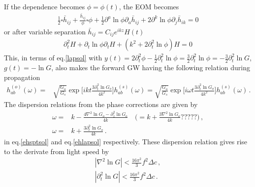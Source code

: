\documentclass[
 jor,
 amsmath,amssymb,preprint,
]{revtex4-2}
\begin{document}
If the dependence becomes $\phi = \phi(t)$, the EOM becomes
\begin{equation}
\begin{aligned}
\frac{1}{2}\square \bar{h}_{ij} + \frac{\bar{h}_{ij}}{\phi}\square \phi + \frac{1}{2} \partial^a \ln\phi \partial_a\bar{h}_{ij} + 2\partial^k \ln\phi\partial_j \bar{h}_{ik} = 0
\end{aligned}
\end{equation}
or after variable separation $\bar{h}_{ij} = C_{ij}e^{ikz}H(t)$
\begin{equation}
\begin{aligned}
\partial_t^2H + \partial_t\ln\phi \partial_tH + (k^2 + 2\partial_t^2\ln\phi) H = 0
\end{aligned}
\end{equation}
This, in terms of eq.\eqref{lapsol} with $y(t) = 2\partial_t^2\phi - \frac{1}{2}\partial_t^2\ln\phi = \frac{3}{2}\partial_t^2\ln\phi = -\frac{3}{2}\partial_t^2\ln G$, $g(t) = -\ln G$, also makes the forward GW having the following relation during propagation
\begin{equation}
\begin{aligned}
h^{(o)}_{ab}(\omega) = & \sqrt{\frac{G_o}{G_s}} \exp\bigg[ik t\frac{3\partial_t^2 \ln G_o}{4k^2} \bigg] h_{ab}^{(s)}(\omega) = \sqrt{\frac{G_o}{G_s}} \exp\bigg[i\omega t\frac{3\partial_t^2 \ln G_o}{4k^2} \bigg] h_{ab}^{(s)}(\omega)\,. \label{ehlapsol}
\end{aligned}
\end{equation}
The dispersion relations from the phase corrections are given by
\begin{align}
\omega = & k - \frac{ 4\nabla^2\ln G_o -\partial_z^2 \ln G_o}{4k} \quad \bigg( = k + \frac{ 3\nabla^2 \ln G_o}{4k}????? \bigg) \,, \\
\omega = & k + \frac{ 3\partial_t^2 \ln G_o}{4k} \,.
\end{align}
in eq.\eqref{ehsptsol} and eq.\eqref{ehlapsol} respectively. These dispersion relation gives rise to the derivate from light speed by
\begin{align}
|\nabla^2\ln G| < \frac{16\pi^2}{3} f^2 \Delta c\,, \\
|\partial_t^2\ln G| < \frac{16\pi^2}{3} f^2 \Delta c\,.
\end{align}
\end{document}
